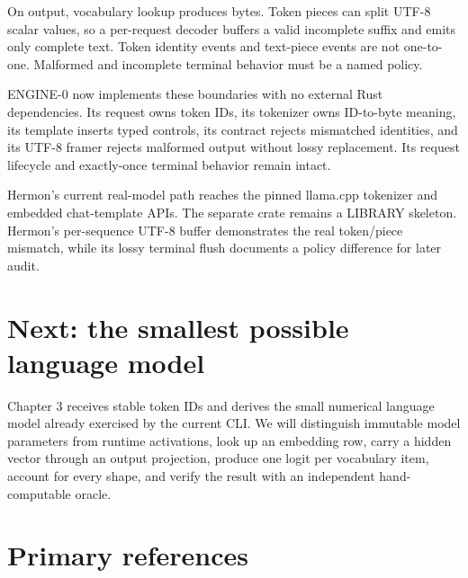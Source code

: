 On output, vocabulary lookup produces bytes. Token pieces can split
UTF-8 scalar values, so a per-request decoder buffers a valid incomplete
suffix and emits only complete text. Token identity events and
text-piece events are not one-to-one. Malformed and incomplete terminal
behavior must be a named policy.

ENGINE-0 now implements these boundaries with no external Rust
dependencies. Its request owns token IDs, its tokenizer owns ID-to-byte
meaning, its template inserts typed controls, its contract rejects
mismatched identities, and its UTF-8 framer rejects malformed output
without lossy replacement. Its request lifecycle and exactly-once
terminal behavior remain intact.

Hermon's current real-model path reaches the pinned llama.cpp tokenizer
and embedded chat-template APIs. The separate
\texttt{} crate remains a LIBRARY skeleton.
Hermon's per-sequence UTF-8 buffer demonstrates the real token/piece
mismatch, while its lossy terminal flush documents a policy difference
for later audit.

\section{Next: the smallest possible language
model}\label{next-the-smallest-possible-language-model}

Chapter 3 receives stable token IDs and derives the small numerical language
model already exercised by the current CLI. We will distinguish immutable
model parameters from runtime
activations, look up an embedding row, carry a hidden vector through an
output projection, produce one logit per vocabulary item, account for
every shape, and verify the result with an independent hand-computable
oracle.

\section{Primary references}\label{primary-references-1}


